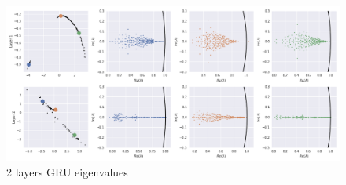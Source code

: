 \documentclass{article}
\begin{document}
\begin{figure}[H]
  \centering
  \includegraphics[width=\textwidth]{../images/gru_2layer_eig.png}
  \caption{2 layers GRU eigenvalues}
  \label{fig:-images-gru_2layer_eig-png}
\end{figure}
\end{document}
